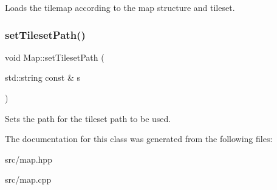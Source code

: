 Loads the tilemap according to the map structure and tileset. \hypertarget{classMap_accb446c23d408f95e6944fedc742b79f}{}\label{classMap_accb446c23d408f95e6944fedc742b79f} 
\subsubsection{\texorpdfstring{set\+Tileset\+Path()}{setTilesetPath()}}
{\footnotesize\ttfamily void Map\+::set\+Tileset\+Path (\begin{DoxyParamCaption}\item[{std\+::string const \&}]{s }\end{DoxyParamCaption})\hspace{0.3cm}{\ttfamily [inline]}}

Sets the path for the tileset path to be used. 

The documentation for this class was generated from the following files\+:\begin{DoxyCompactItemize}
\item 
src/map.\+hpp\item 
src/map.\+cpp\end{DoxyCompactItemize}
